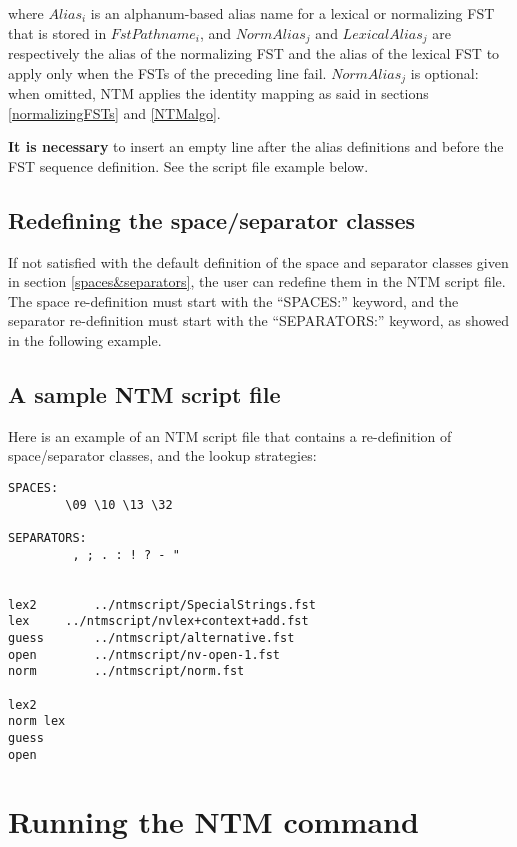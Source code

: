 \documentclass{article}
\begin{document}
\vspace{0.7cm}

where $Alias_i$ is an alphanum-based alias name for a lexical or normalizing FST that is stored in  $FstPathname_i$, and  $NormAlias_j$ and $LexicalAlias_j$ are respectively the alias of the normalizing FST and the alias of the lexical FST to apply only when the FSTs of the preceding line fail. $NormAlias_j$ is optional: when omitted, NTM applies the identity mapping as said in sections \ref{normalizingFSTs} and \ref{NTMalgo}.

{\bf It is necessary} to insert an empty line after the alias definitions and before the FST sequence definition. See the script file example below.


\subsection{Redefining the space/separator classes}

If not satisfied with the default definition of the space and separator classes given in section \ref{spaces&separators}, the user can redefine them in the NTM script file. The space re-definition must start with the ``SPACES:'' keyword, and the separator re-definition must start with the ``SEPARATORS:'' keyword, as showed in the following example.


\subsection{A sample NTM script file}

Here is an example of an NTM script file that contains a re-definition of space/separator classes, and the lookup strategies:

\begin{verbatim}
SPACES:
        \09 \10 \13 \32

SEPARATORS:
         , ; . : ! ? - "


lex2		../ntmscript/SpecialStrings.fst
lex		../ntmscript/nvlex+context+add.fst
guess		../ntmscript/alternative.fst
open		../ntmscript/nv-open-1.fst
norm		../ntmscript/norm.fst

lex2 
norm lex
guess 
open
\end{verbatim}





\section{Running the NTM command}
\end{document}
